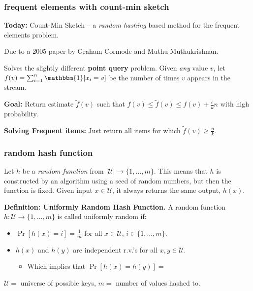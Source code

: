\documentclass[]{beamer}
\begin{document}
	\begin{frame}
		\frametitle{frequent elements with count-min sketch}
		
		\textbf{Today:} Count-Min Sketch -- a \emph{random hashing} based method for the frequent elements problem.
		
		\begin{center}
			Due to a 2005 paper by Graham Cormode and Muthu Muthukrishnan.
		\end{center}
	
	Solves the slightly different \textbf{point query} problem. Given \emph{any} value $v$, let $f(v) = \sum_{i=1}^n \mathbbm{1}[x_i = v]$ be the number of times $v$ appears in the stream. 
	
	\textbf{Goal:} Return estimate $\tilde{f}(v)$ such that $f(v) \leq \tilde{f}(v) \leq f(v) + \frac{\epsilon}{k}n$ with high probability.
	
	
\textbf{Solving Frequent items:} Just return all items for which $\tilde{f}(v) \geq \frac{n}{k}$.
	\end{frame}
	
	\begin{frame}
		\frametitle{random hash function}
		Let $h$ be a \emph{random function} from $|\mathcal{U}| \rightarrow \{1,\ldots, m\}$. This means that $h$ is constructed by an algorithm using a seed of random numbers, but then the function is fixed. Given input $x\in \mathcal{U}$, it always returns the same output, $h(x)$. 
		
		\textbf{Definition: Uniformly Random Hash Function.} 
		A random function $h: \mathcal{U}\rightarrow \{1, \ldots, m\}$ is called uniformly random if:
		\begin{itemize}
			\item $\Pr[h(x) = i] = \frac{1}{m}$ for all $x\in \mathcal{U}$, $i\in \{1,\ldots, m\}$.  
			\vspace{.5em}
			\item $h(x)$ and $h(y)$ are independent r.v.'s for all $x,y\in \mathcal{U}$. 
			\begin{itemize}
				\vspace{.5em}
				\item Which implies that $\Pr[h(x) = h(y)] = $ 
			\end{itemize}
		\end{itemize}
		
		\vspace{3em}
		\begin{block}{\vspace*{-3ex}}
			\small $\mathcal{U} = $ universe of possible keys, $m=$ number of values hashed to.
		\end{block}
	\end{frame}
	
\end{document}
